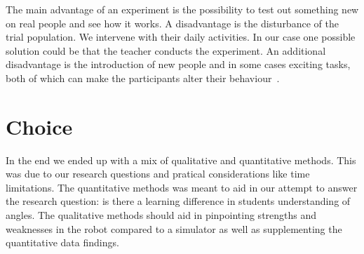 \bigskip\noindent
The main advantage of an experiment is the possibility  to test out something new on real people and see how it works.
A disadvantage is the disturbance of the trial population. We intervene with their daily activities. In our case one possible solution could be that the teacher conducts the experiment. 
An additional disadvantage is the introduction of new people and in some cases exciting tasks, both of which can make the participants alter their behaviour~\cite{fernandes2006using, miller2008robots}.

\section{Choice}
In the end we ended up with a mix of qualitative and quantitative methods. This was due to our research questions and pratical considerations like time limitations. 
The quantitative methods was meant to aid in our attempt to answer the research question: is there a learning difference in students understanding of angles. The qualitative methods should aid in pinpointing strengths and weaknesses in the robot compared to a simulator as well as supplementing the quantitative data findings. 

